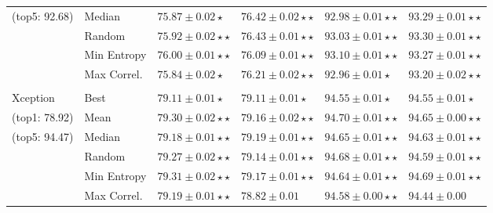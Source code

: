 \begin{table}[h!]
\begin{tabularx}{\textwidth}{XX|YY|YY}
	 (top5: 92.68)                    & Median                   & $ 75.87 \pm 0.02 \star$              & $ 76.42 \pm 0.02 \star\star$         & $92.98 \pm 0.01\star\star$          & $93.29 \pm 0.01\star\star$          \\
									& Random                   & $75.92 \pm 0.02 \star\star$          & $76.43 \pm 0.01 \star\star$          & $93.03 \pm 0.01\star\star$          & $93.30 \pm 0.01\star\star$          \\
									& Min Entropy              & $\mathbf{76.00\pm0.01\star\star}$    & $76.09\pm0.01\star\star$             & $\mathbf{93.10\pm0.01\star\star}$   & $\mathbf{93.27\pm0.01\star\star}$   \\
									& Max Correl.              & $75.84\pm0.02\star$                  & $76.21\pm0.02\star\star$             & $92.96\pm0.01\star$                 & $93.20\pm0.02\star\star$            \\
									&                          &                                      &                                      &                                     &                                     \\
	 { Xception}                    & Best                     & $79.11 \pm 0.01 \star$               & $79.11 \pm 0.01 \star$               & $94.55 \pm 0.01\star$               & $94.55 \pm 0.01\star$               \\
	 (top1: 78.92)                    & Mean                     & $\mathbf{79.30 \pm 0.02} \star\star$ & $79.16 \pm 0.02 \star\star$          & $\mathbf{94.70 \pm 0.01}\star\star$ & $94.65 \pm 0.00\star\star$          \\
	 (top5: 94.47)                    & Median                   & $79.18 \pm 0.01 \star\star$          & $\mathbf{79.19 \pm 0.01 \star\star}$ & $94.65 \pm 0.01\star\star$          & $94.63 \pm 0.01\star\star$          \\
									& Random                   & $79.27 \pm 0.02 \star\star$          & $79.14\pm 0.01 \star\star$           & $94.68 \pm 0.01\star\star$          & $94.59 \pm 0.01\star\star$          \\
									& Min Entropy              & $79.31\pm0.02\star\star$             & $\mathbf{79.17\pm0.01\star\star}$    & $94.64\pm0.01\star\star$            & $\mathbf{94.69\pm0.01\star\star}$   \\
									& Max Correl.              & $79.19\pm0.01\star\star$             & $78.82\pm0.01$                       & $94.58\pm0.00\star\star$            & $94.44\pm0.00$                      \\ \bottomrule
 \end{tabularx}
\label{tab:results1}


 \end{table}



